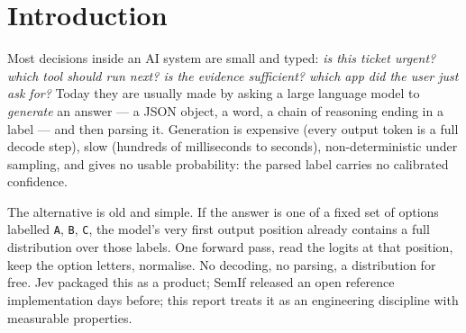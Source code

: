 \documentclass[11pt,a4paper]{article}
\newcommand{\code}[1]{\texttt{#1}}
\begin{document}
\begin{abstract}
it; 64 numbers per state carry it and transfer across workflows; 50 typical labels per question on top of the 12B's zero-shot answers reach 0.766; a probe trained on English only serves ten other languages at 0.803 macro; a universal answer-correctness probe decides on workflows it has never seen at 0.622, against 0.49 for the model's own letters; the probe comes out calibrated (ECE 0.023) and conformal selection acts on 40\,\% of decisions with a 5\,\% error bound. Cutting the served 4B GGUF to 24 of its 32 blocks keeps the probe's accuracy (0.793) at 1.5$\times$ the speed; the same cut helps the zero-shot letters on typed-decisions and hurts them on most public tasks. Probes trained on zero-shot answers match their teacher but never beat it, several borrowed ideas fail, and the remaining errors sit where the benchmark's own labels are split. All numbers were audited; the audit corrections are reported.
\end{abstract}

\tableofcontents

\section{Introduction}

Most decisions inside an AI system are small and typed: \emph{is this ticket urgent? which tool should run next? is the evidence sufficient? which app did the user just ask for?} Today they are usually made by asking a large language model to \emph{generate} an answer --- a JSON object, a word, a chain of reasoning ending in a label --- and then parsing it. Generation is expensive (every output token is a full decode step), slow (hundreds of milliseconds to seconds), non-deterministic under sampling, and gives no usable probability: the parsed label carries no calibrated confidence.

The alternative is old and simple. If the answer is one of a fixed set of options labelled \code{A}, \code{B}, \code{C}, the model's very first output position already contains a full distribution over those labels. One forward pass, read the logits at that position, keep the option letters, normalise. No decoding, no parsing, a distribution for free. Jev packaged this as a product; SemIf \cite{semif} released an open reference implementation days before; this report treats it as an engineering discipline with measurable properties.
\end{document}

